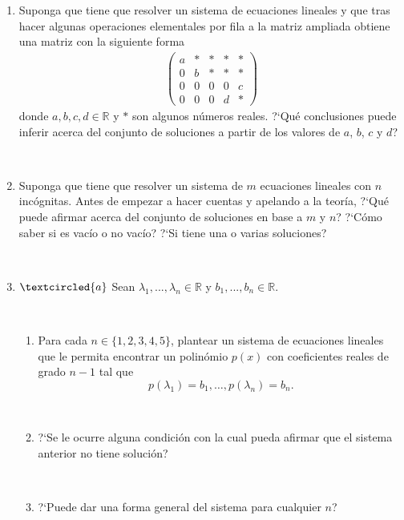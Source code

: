 \documentclass[12pt]{amsart}
\newcommand{\R}{\mathbb R}
\begin{document}
\begin{enumerate}
\

\item Suponga que tiene que resolver un sistema de ecuaciones lineales y que tras hacer algunas operaciones elementales por fila a la matriz ampliada obtiene una matriz con la siguiente forma
\begin{align*}
\left(
\begin{array}{cccc|c}
a & * & * & * & *\\
0 & b & * & * & *\\
0 & 0 & 0 & 0 & c\\
0 & 0 & 0 & d & *
\end{array}
\right)
\end{align*}
donde $a,b,c,d\in\R$ y $*$ son algunos n\'umeros reales.
?`Qu\'e conclusiones puede inferir acerca del conjunto de soluciones a partir de los valores de $a$, $b$, $c$ y $d$?

\

\item Suponga que tiene que resolver un sistema de $m$ ecuaciones lineales con $n$ inc\'ognitas. Antes de empezar a hacer cuentas y apelando a la teor\'ia, ?`Qu\'e puede afirmar acerca del conjunto de soluciones en base a $m$ y $n$? ?`C\'omo saber si es vac\'io o no vac\'io? ?`Si tiene una o varias soluciones?

\

\item\label{polinomios} $\textcircled{a}$ Sean $\lambda_1, ..., \lambda_n\in\R$ y $b_1, ..., b_n\in\R$.

\

\begin{enumerate}
 \item Para cada $n\in\{1,2,3,4,5\}$, plantear un sistema de ecuaciones lineales que le permita encontrar un polin\'omio $p(x)$ con coeficientes reales de grado $n-1$ tal que
 $$
 p(\lambda_1)=b_1, \dots, p(\lambda_n)=b_n.
 $$

 \

\item ?`Se le ocurre alguna condici\'on con la cual pueda afirmar que el sistema anterior no tiene soluci\'on?

\

\item  ?`Puede dar una forma general del sistema para cualquier $n$?

\end{enumerate}

\end{enumerate}
\end{document}
